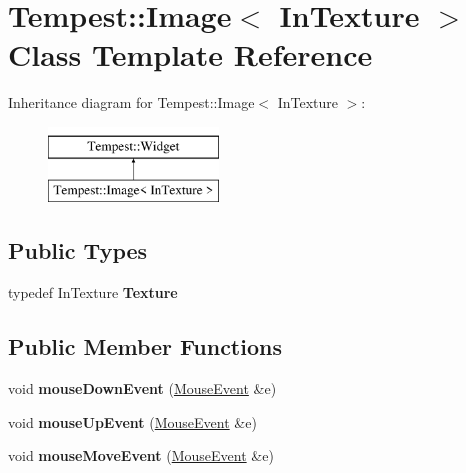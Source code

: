 \hypertarget{class_tempest_1_1_image}{\section{Tempest\+:\+:Image$<$ In\+Texture $>$ Class Template Reference}
\label{class_tempest_1_1_image}
}
Inheritance diagram for Tempest\+:\+:Image$<$ In\+Texture $>$\+:\begin{figure}[H]
\begin{center}
\leavevmode
\includegraphics[height=2.000000cm]{class_tempest_1_1_image}
\end{center}
\end{figure}
\subsection*{Public Types}
\begin{DoxyCompactItemize}
\item 
\hypertarget{class_tempest_1_1_image_afdc4124969ddb46505027e94df5ce192}{typedef In\+Texture {\bfseries Texture}}\label{class_tempest_1_1_image_afdc4124969ddb46505027e94df5ce192}

\end{DoxyCompactItemize}
\subsection*{Public Member Functions}
\begin{DoxyCompactItemize}
\item 
\hypertarget{class_tempest_1_1_image_af851d98fa6c7fb1e66487831aa3ac396}{void {\bfseries mouse\+Down\+Event} (\hyperlink{class_tempest_1_1_mouse_event}{Mouse\+Event} \&e)}\label{class_tempest_1_1_image_af851d98fa6c7fb1e66487831aa3ac396}

\item 
\hypertarget{class_tempest_1_1_image_af26d8f04022a0b1cd06089eac8ecdbf1}{void {\bfseries mouse\+Up\+Event} (\hyperlink{class_tempest_1_1_mouse_event}{Mouse\+Event} \&e)}\label{class_tempest_1_1_image_af26d8f04022a0b1cd06089eac8ecdbf1}

\item 
\hypertarget{class_tempest_1_1_image_aac34676b7db6a0184013a0e2dcc87888}{void {\bfseries mouse\+Move\+Event} (\hyperlink{class_tempest_1_1_mouse_event}{Mouse\+Event} \&e)}\label{class_tempest_1_1_image_aac34676b7db6a0184013a0e2dcc87888}

\end{DoxyCompactItemize}
